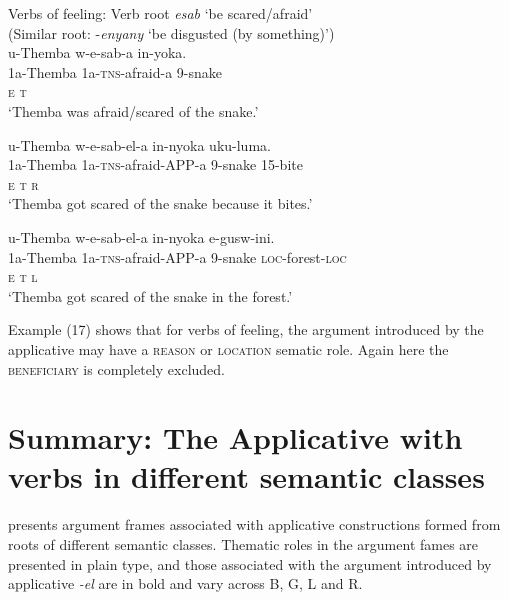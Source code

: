 \documentclass[output=paper]{langsci/langscibook}
\begin{document}
\ea
{Verbs of feeling: Verb root \textit{esab} ‘be scared/afraid’}\\
 (Similar root: -\textit{enyany} ‘be disgusted (by something)’)\\
\ea
\gll u-Themba w-e-sab-a in-yoka. \\
 1a-Themba 1a-\textsc{tns}-afraid-a 9-snake\\
 \textsc{e t }\\
\glt ‘Themba was afraid/scared of the snake.’

\ex
\gll u-Themba w-e-sab-el-a in-nyoka uku-luma. \\
 1a-Themba 1a-\textsc{tns}-afraid-APP-a 9-snake 15-bite\\
 \textsc{e t r}\\
\glt ‘Themba got scared of the snake because it bites.’

\ex
\gll u-Themba w-e-sab-el-a in-nyoka e-gusw-ini. \\
 1a-Themba 1a-\textsc{tns}-afraid-APP-a 9-snake \textsc{loc}-forest-\textsc{loc}\\
 \textsc{e t l}\\
\glt ‘Themba got scared of the snake in the forest.’
\z
\z

Example (17) shows that for verbs of feeling, the argument introduced by the applicative may have a \textsc{reason} or \textsc{location} sematic role. Again here the \textsc{beneficiary} is completely excluded. 

\section{Summary: The Applicative with verbs in different semantic classes}

 presents argument frames associated with applicative constructions formed from roots of different semantic classes. Thematic roles in the argument fames are presented in plain type, and those associated with the argument introduced by applicative \textit{-el} are in bold and vary across B, G, L and R. 
\end{document}
